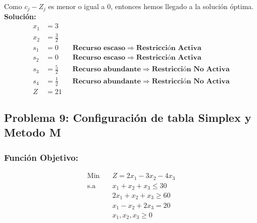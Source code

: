 \documentclass{templateNote}
\begin{document}
Como $c_j - Z_j$ es menor o igual a 0, entonces hemos llegado a la solución óptima.
\textbf{Solución:}
\begin{align*}
    x_1 &= 3 \\
    x_2 &= \displaystyle\frac{3}{2} \\
    s_1 &= 0 \qquad \textbf{Recurso escaso} \Rightarrow \textbf{Restricción Activa}\\
    s_2 &= 0 \qquad \textbf{Recurso escaso} \Rightarrow \textbf{Restricción Activa}\\
    s_3 &= \displaystyle\frac{5}{2} \qquad \textbf{Recurso abundante} \Rightarrow \textbf{Restricción No Activa}\\
    s_4 &= \displaystyle\frac{1}{2} \qquad \textbf{Recurso abundante} \Rightarrow \textbf{Restricción No Activa}\\
    Z &= 21
\end{align*}

\newpage
\subsection*{Problema 9: Configuración de tabla Simplex y Metodo M}

\subsubsection*{Función Objetivo:}
\begin{equation*}
    \begin{aligned}
        \text{Min} \quad & Z = 2x_1 - 3x_2 - 4x_3\\
        \text{s.a} \quad & x_1 + x_2 + x_3 \leq 30 \\
        & 2x_1 + x_2 + x_3 \geq 60 \\
        & x_1 - x_2 + 2x_3 = 20 \\
        & x_1, x_2, x_3 \geq 0
    \end{aligned}
\end{equation*}
\end{document}
